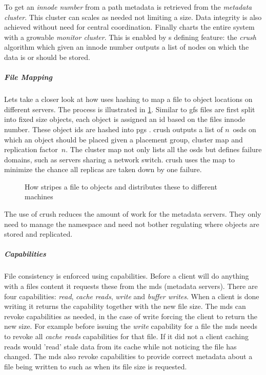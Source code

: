 To get an \textit{innode number} from a path metadata is retrieved from the \textit{metadata cluster}. This cluster can scales as needed not limiting a  size. Data integrity is also achieved without need for central coordination. Finally  charts the entire system with a growable \textit{monitor cluster}. This is enabled by s defining feature: the \emph{\ac{crush}} algorithm which given an innode number outputs a list of nodes on which the data is or should be stored.

\subparagraph{File Mapping}
Lets take a closer look at how  uses hashing to map a file to object locations on different servers. The process is illustrated in \cref{fig:ceph_crush}. Similar to \ac{gfs} files are first split into fixed size objects, each object is assigned an id based on the files innode number. These object ids are hashed into \acp{pg} . \ac{crush} outputs a list of $n$~\acp{osd} on which an object should be placed given a placement group, cluster map and replication factor~$n$. The cluster map not only lists all the \acp{osd} but defines failure domains, such as servers sharing a network switch. \ac{crush} uses the map to minimize the chance all replicas are taken down by one failure.

\begin{figure}[htbp]
	\centering
	
	\caption{How  stripes a file to objects and distributes these to different machines}
	\label{fig:ceph_crush}
\end{figure}

The use of \ac{crush} reduces the amount of work for the metadata servers. They only need to manage the namespace and need not bother regulating where objects are stored and replicated.

\subparagraph{Capabilities}
File consistency is enforced using capabilities. Before a client will do anything with a files content it requests these from the \ac{mds} (metadata servers). There are four capabilities: \textit{read}, \textit{cache} \textit{reads}, \textit{write} and \textit{buffer writes}. When a client is done writing it returns the capability together with the new file size. The \ac{mds} can revoke capabilities as needed, in the case of write forcing the client to return the new size. For example before issuing the \textit{write} capability for a file the \ac{mds} needs to revoke all \textit{cache reads} capabilities for that file. If it did not a client caching reads would 'read' stale data from its cache while not noticing the file has changed. The \ac{mds} also revoke capabilities to provide correct metadata about a file being written to such as when its file size is requested.

